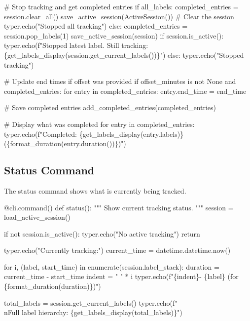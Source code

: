     # Stop tracking and get completed entries
    if all_labels:
        completed_entries = session.clear_all()
        save_active_session(ActiveSession())  # Clear the session
        typer.echo("Stopped all tracking")
    else:
        completed_entries = session.pop_labels(1)
        save_active_session(session)
        if session.is_active():
            typer.echo(f"Stopped latest label. Still tracking: \{get_labels_display(session.get_current_labels())\}")
        else:
            typer.echo("Stopped tracking")
    
    # Update end times if offset was provided
    if offset_minutes is not None and completed_entries:
        for entry in completed_entries:
            entry.end_time = end_time
    
    # Save completed entries
    add_completed_entries(completed_entries)
    
    # Display what was completed
    for entry in completed_entries:
        typer.echo(f"Completed: \{get_labels_display(entry.labels)\} (\{format_duration(entry.duration())\})")
\nwendcode{}\nwdocspar

\subsection{Status Command}

The status command shows what is currently being tracked.

\nwenddocs{}\endmoddef\nwstartdeflinemarkup{}\nwenddeflinemarkup
@cli.command()
def status():
    """
    Show current tracking status.
    """
    session = load_active_session()
    
    if not session.is_active():
        typer.echo("No active tracking")
        return
    
    typer.echo("Currently tracking:")
    current_time = datetime.datetime.now()
    
    for i, (label, start_time) in enumerate(session.label_stack):
        duration = current_time - start_time
        indent = "  " * i
        typer.echo(f"\{indent\}- \{label\} (for \{format_duration(duration)\})")
    
    total_labels = session.get_current_labels()
    typer.echo(f"\\nFull label hierarchy: \{get_labels_display(total_labels)\}")
\nwendcode{}\nwdocspar


